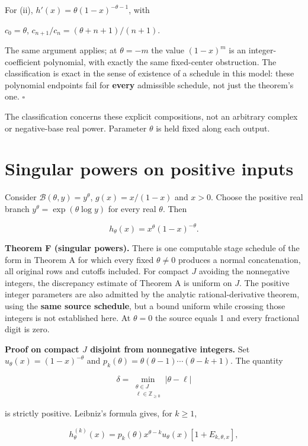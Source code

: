 \documentclass[11pt,a4paper]{article}
\begin{document}
For (ii), \(h'(x)=\theta(1-x)^{-\theta-1}\), with

\(c_0=\theta\), \(c_{n+1}/c_n=(\theta+n+1)/(n+1)\).

The same argument applies; at \(\theta=-m\) the value \((1-x)^m\) is an
integer-coefficient polynomial, with exactly the same fixed-center
obstruction. The classification is exact in the sense of existence of a
schedule in this model: these polynomial endpoints fail for
\textbf{every} admissible schedule, not just the theorem's one.
\(\square\)

The classification concerns these explicit compositions, not an
arbitrary complex or negative-base real power. Parameter \(\theta\) is
held fixed along each output.

\section{Singular powers on positive
inputs}\label{singular-powers-on-positive-inputs}

Consider \(\mathcal B(\theta,y)=y^\theta\), \(g(x)=x/(1-x)\) and
\(x>0\). Choose the positive real branch
\(y^\theta=\exp(\theta \log y)\) for every real \(\theta\). Then

\[
h_\theta(x)=x^\theta (1-x)^{-\theta}.
\]

\textbf{Theorem F (singular powers).} There is one computable stage
schedule of the form in Theorem A for which every fixed
\textbf{\(\theta\ne 0\)} produces a normal concatenation, all original
rows and cutoffs included. For compact \(J\) avoiding the nonnegative
integers, the discrepancy estimate of Theorem A is uniform on \(J\). The
positive integer parameters are also admitted by the analytic
rational-derivative theorem, using the \textbf{same source schedule},
but a bound uniform while crossing those integers is not established
here. At \(\theta=0\) the source equals 1 and every fractional digit is
zero.

\textbf{Proof on compact \(J\) disjoint from nonnegative integers.} Set
\(u_\theta(x)=(1-x)^{-\theta}\) and
\(p_k(\theta)=\theta(\theta-1)\cdots(\theta-k+1)\). The quantity

\[
\delta=\min_{\substack{\theta\in J\\ \ell\in\mathbb Z_{\ge 0}}}|\theta-\ell|
\]

is strictly positive. Leibniz's formula gives, for \(k\ge 1\),

\[
h_\theta^{(k)}(x)=p_k(\theta) x^{\theta-k} u_\theta(x) [1+E_{k,\theta,x}],
\]
\end{document}
